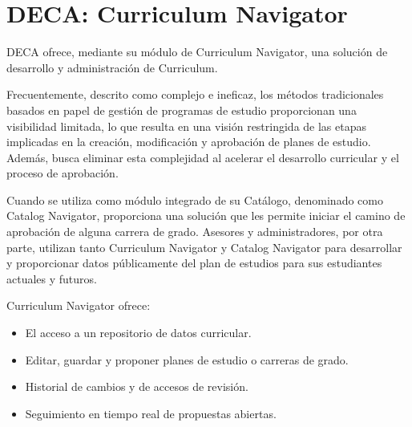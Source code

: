 \section{DECA: Curriculum Navigator}
DECA ofrece, mediante su módulo de Curriculum Navigator, una solución de desarrollo y administración de Curriculum.

Frecuentemente, descrito como complejo e ineficaz, los métodos tradicionales basados en papel de gestión de programas de estudio proporcionan una visibilidad limitada, lo que resulta en una visión restringida de las etapas implicadas en la creación, modificación y aprobación de planes de estudio. Además, busca eliminar esta complejidad al acelerar el desarrollo curricular y el proceso de aprobación.

Cuando se utiliza como módulo integrado de su Catálogo, denominado como Catalog Navigator, proporciona una solución que les permite iniciar el camino de aprobación de alguna carrera de grado. Asesores y administradores, por otra parte, utilizan tanto Curriculum Navigator y Catalog Navigator para desarrollar y proporcionar datos públicamente del plan de estudios para sus estudiantes actuales y futuros.

Curriculum Navigator ofrece:
\begin{itemize}
	\item El acceso a un repositorio de datos curricular.
	\item Editar, guardar y proponer planes de estudio o carreras de grado.
	\item Historial de cambios y de accesos de revisión.
	\item Seguimiento en tiempo real de propuestas abiertas.
\end{itemize}